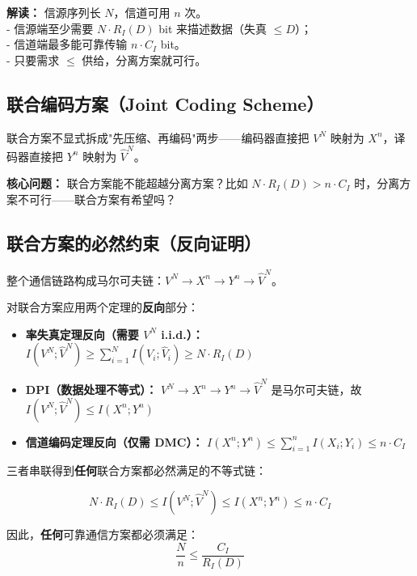 \documentclass[12pt,a4paper]{ctexart}
\theoremstyle{definition}
\begin{document}
\textbf{解读：} 信源序列长 $N$，信道可用 $n$ 次。\\
- 信源端至少需要 $N \cdot R_I(D)$ bit 来描述数据（失真 $\leq D$）；\\
- 信道端最多能可靠传输 $n \cdot C_I$ bit。\\
- 只要需求 $\leq$ 供给，分离方案就可行。

\subsection{联合编码方案（Joint Coding Scheme）}

联合方案不显式拆成"先压缩、再编码"两步——编码器直接把 $V^N$ 映射为 $X^n$，译码器直接把 $Y^n$ 映射为 $\hat{V}^N$。

\begin{center}
\end{center}

\textbf{核心问题：} 联合方案能不能超越分离方案？比如 $N \cdot R_I(D) > n \cdot C_I$ 时，分离方案不可行——联合方案有希望吗？

\subsection{联合方案的必然约束（反向证明）}

整个通信链路构成马尔可夫链：$V^N \to X^n \to Y^n \to \hat{V}^N$。

对联合方案应用两个定理的\textbf{反向}部分：

\begin{itemize}[nosep]
  \item \textbf{率失真定理反向（需要 $V^N$ i.i.d.）：}
  $I(V^N; \hat{V}^N) \geq \sum_{i=1}^N I(V_i; \hat{V}_i) \geq N \cdot R_I(D)$
  \item \textbf{DPI（数据处理不等式）：}
  $V^N \to X^n \to Y^n \to \hat{V}^N$ 是马尔可夫链，故
  $I(V^N; \hat{V}^N) \leq I(X^n; Y^n)$
  \item \textbf{信道编码定理反向（仅需 DMC）：}
  $I(X^n; Y^n) \leq \sum_{i=1}^{n} I(X_i; Y_i) \leq n \cdot C_I$
\end{itemize}

三者串联得到\textbf{任何}联合方案都必然满足的不等式链：

\begin{keybox}[联合编码的必要条件]
\[
\boxed{N \cdot R_I(D) \leq I(V^N; \hat{V}^N) \leq I(X^n; Y^n) \leq n \cdot C_I}
\]

因此，\textbf{任何}可靠通信方案都必须满足：
\[
\frac{N}{n} \leq \frac{C_I}{R_I(D)}
\]
\end{keybox}
\end{document}
